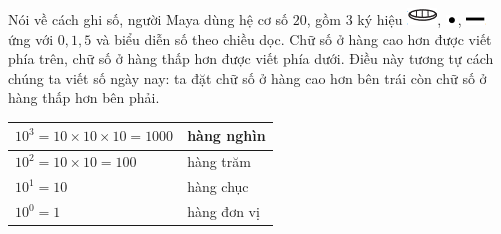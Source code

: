 \begin{multicols}{2}
	\vskip 0.1cm
	Nói về cách ghi số,  người Maya dùng hệ cơ số $20$, gồm $3$ ký hiệu \includegraphics[scale=0.7]{29},  \includegraphics[scale=0.7]{30}, \includegraphics[scale=0.7]{31}  ứng với $0,1, 5$ và biểu diễn số theo chiều dọc. Chữ số ở hàng cao hơn được viết phía trên, chữ số ở hàng thấp hơn được viết phía dưới. Điều này tương tự cách chúng ta viết số ngày nay: ta đặt chữ số ở hàng cao hơn bên trái còn chữ số ở hàng thấp hơn bên phải. 
	\begin{table}[H]
		\vspace*{-5pt}
		\centering
		\setlength{\tabcolsep}{4.5pt}
		\renewcommand{\arraystretch}{1.3}
		\begin{tabular}{|l|l|}
			\hline
			$10^3 = 10\!\times\! 10 \!\times\! 10 =1000$& hàng nghìn\\
			\hline
			$10^2 = 10\!\times\! 10 =100$& hàng trăm\\
			\hline
			$10^1 = 10$& hàng chục\\
			\hline
			$10^0 = 1$& hàng đơn vị\\
			\hline
		\end{tabular}
	\end{table}

\end{multicols}
